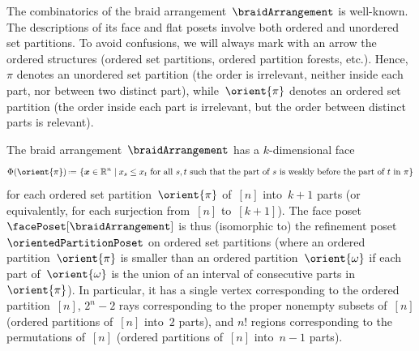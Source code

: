 \documentclass{amsart}
\theoremstyle{definition}
\newcommand{\R}{\mathbb{R}} %
\renewcommand{\b}[1]{{\boldsymbol{#1}}} %
\newcommand{\set}[2]{\left\{ #1 \;\middle|\; #2 \right\}} %
\newcommand{\eqdef}{\mbox{\,\raisebox{0.2ex}{\scriptsize\ensuremath{\mathrm:}}\ensuremath{=}\,}} %
\renewcommand{\b}[1]{\boldsymbol{#1}} %
\begin{document}
The combinatorics of the braid arrangement~$\braidArrangement$ is well-known.
The descriptions of its face and flat posets involve both ordered and unordered set partitions.
To avoid confusions, we will always mark with an arrow the ordered structures (ordered set partitions, ordered partition forests, etc.).
Hence, $\pi$ denotes an unordered set partition (the order is irrelevant, neither inside each part, nor between two distinct part), while~$\orient{\pi}$ denotes an ordered set partition (the order inside each part is irrelevant, but the order between distinct parts is relevant).

The braid arrangement~$\braidArrangement$ has a $k$-dimensional face
\[
\Phi(\orient{\pi}) \eqdef \set{\b{x} \in \R^n}{x_s \le x_t \text{ for all $s,t$ such that the part of~$s$ is weakly before the part of~$t$ in $\pi$}}
\]
for each ordered set partition~$\orient{\pi}$ of~$[n]$ into~$k+1$ parts (or equivalently, for each surjection from~$[n]$ to~$[k+1]$).
The face poset~$\facePoset[\braidArrangement]$ is thus (isomorphic to) the refinement poset~$\orientedPartitionPoset$ on ordered set partitions (where an ordered partition~$\orient{\pi}$ is smaller than an ordered partition~$\orient{\omega}$ if each part of~$\orient{\omega}$ is the union of an interval of consecutive parts in~$\orient{\pi}$).
In particular, it has a single vertex corresponding to the ordered partition~$[n]$, $2^n-2$ rays corresponding to the proper nonempty subsets of~$[n]$ (ordered partitions of~$[n]$ into~$2$ parts), and $n!$ regions corresponding to the permutations of~$[n]$ (ordered partitions of~$[n]$ into~$n-1$ parts).
\end{document}
